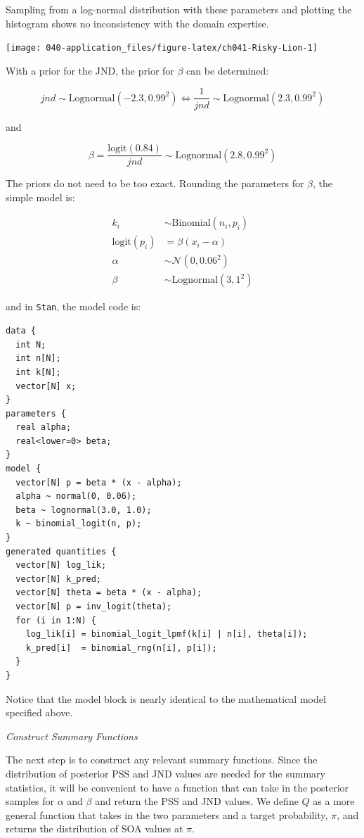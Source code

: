\documentclass[11pt, oneside, openany]{scrbook}
\begin{document}

Sampling from a log-normal distribution with these parameters and plotting the histogram shows no inconsistency with the domain expertise.

\begin{center}\texttt{[image: 040-application\_files/figure-latex/ch041-Risky-Lion-1]} \end{center}

With a prior for the JND, the prior for \(\beta\) can be determined:


\[
jnd \sim \mathrm{Lognormal}(-2.3, 0.99^2) \Longleftrightarrow \frac{1}{jnd} \sim \mathrm{Lognormal}(2.3, 0.99^2)
\]

and

\[
\beta = \frac{\mathrm{logit}(0.84)}{jnd} \sim \mathrm{Lognormal}(2.8, 0.99^2)
\]

The priors do not need to be too exact. Rounding the parameters for \(\beta\), the simple model is:

\begin{align*}
  k_i &\sim \mathrm{Binomial}(n_i, p_i) \\
  \mathrm{logit}(p_i) &= \beta ( x_i - \alpha ) \\
  \alpha &\sim \mathcal{N}(0, 0.06^2) \\
  \beta &\sim \mathrm{Lognormal}(3, 1^2)
\end{align*}

and in \texttt{Stan}, the model code is:

\begin{verbatim}
data {
  int N;
  int n[N];
  int k[N];
  vector[N] x;
}
parameters {
  real alpha;
  real<lower=0> beta;
}
model {
  vector[N] p = beta * (x - alpha);
  alpha ~ normal(0, 0.06);
  beta ~ lognormal(3.0, 1.0);
  k ~ binomial_logit(n, p);
}
generated quantities {
  vector[N] log_lik;
  vector[N] k_pred;
  vector[N] theta = beta * (x - alpha);
  vector[N] p = inv_logit(theta);
  for (i in 1:N) {
    log_lik[i] = binomial_logit_lpmf(k[i] | n[i], theta[i]);
    k_pred[i]  = binomial_rng(n[i], p[i]);
  }
}
\end{verbatim}


Notice that the model block is nearly identical to the mathematical model specified above.

\emph{Construct Summary Functions}

The next step is to construct any relevant summary functions. Since the distribution of posterior PSS and JND values are needed for the summary statistics, it will be convenient to have a function that can take in the posterior samples for \(\alpha\) and \(\beta\) and return the PSS and JND values. We define \(Q\) as a more general function that takes in the two parameters and a target probability, \(\pi\), and returns the distribution of SOA values at \(\pi\).
\end{document}
